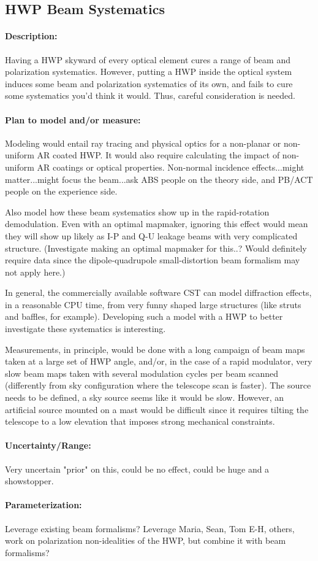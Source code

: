 
\subsection{HWP Beam Systematics}


\paragraph{Description:}
Having a HWP skyward of every optical element cures a range of beam and polarization systematics. However, putting a HWP inside the optical system induces some beam and polarization systematics of its own, and fails to cure some systematics you'd think it would. Thus, careful consideration is needed.

\paragraph{Plan to model and/or measure:}
Modeling would entail ray tracing and physical optics for a non-planar or non-uniform AR coated HWP. It would also require calculating the impact of non-uniform AR coatings or optical properties. Non-normal incidence effects...might matter...might focus the beam...ask ABS people on the theory side, and PB/ACT people on the experience side.

Also model how these beam systematics show up in the rapid-rotation demodulation. Even with an optimal mapmaker, ignoring this effect would mean they will show up likely as I-P and Q-U leakage beams with very complicated structure. (Investigate making an optimal mapmaker for this..? Would definitely require data since the dipole-quadrupole small-distortion beam formalism may not apply here.)

In general, the commercially available software CST can model diffraction effects, in a reasonable CPU time, from very funny shaped large structures (like struts and baffles, for example). Developing such a model with a HWP to better investigate these systematics is interesting.

Measurements, in principle, would be done with a long campaign of beam maps taken at a large set of HWP angle, and/or, in the case of a rapid modulator, very slow beam maps taken with several modulation cycles per beam scanned (differently from sky configuration where the telescope scan is faster). The source needs to be defined, a sky source seems like it would be slow. However, an artificial source mounted on a mast would be difficult since it requires tilting the telescope to a low elevation that imposes strong mechanical constraints.

\paragraph{Uncertainty/Range:}
Very uncertain "prior" on this, could be no effect, could be huge and a showstopper.

\paragraph{Parameterization:}

Leverage existing beam formalisms? Leverage Maria, Sean, Tom E-H, others, work on polarization non-idealities of the HWP, but combine it with beam formalisms?
